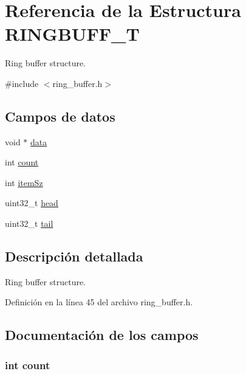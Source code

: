 \hypertarget{struct_r_i_n_g_b_u_f_f___t}{}\section{Referencia de la Estructura R\+I\+N\+G\+B\+U\+F\+F\+\_\+T}
\label{struct_r_i_n_g_b_u_f_f___t}


Ring buffer structure.  




{\ttfamily \#include $<$ring\+\_\+buffer.\+h$>$}

\subsection*{Campos de datos}
\begin{DoxyCompactItemize}
\item 
void $\ast$ \hyperlink{struct_r_i_n_g_b_u_f_f___t_a735984d41155bc1032e09bece8f8d66d}{data}
\item 
int \hyperlink{struct_r_i_n_g_b_u_f_f___t_ad43c3812e6d13e0518d9f8b8f463ffcf}{count}
\item 
int \hyperlink{struct_r_i_n_g_b_u_f_f___t_a674989c87ac831d9e5a28faf3bd1545c}{item\+Sz}
\item 
uint32\+\_\+t \hyperlink{struct_r_i_n_g_b_u_f_f___t_ac8143ecb1dda85e708e5252e0106dd13}{head}
\item 
uint32\+\_\+t \hyperlink{struct_r_i_n_g_b_u_f_f___t_a3da51da0aebd2ac8b1ab802259126311}{tail}
\end{DoxyCompactItemize}


\subsection{Descripción detallada}
Ring buffer structure. 

Definición en la línea 45 del archivo ring\+\_\+buffer.\+h.



\subsection{Documentación de los campos}
\subsubsection[{\texorpdfstring{count}{count}}]{\setlength{\rightskip}{0pt plus 5cm}int count}\hypertarget{struct_r_i_n_g_b_u_f_f___t_ad43c3812e6d13e0518d9f8b8f463ffcf}{}\label{struct_r_i_n_g_b_u_f_f___t_ad43c3812e6d13e0518d9f8b8f463ffcf}


